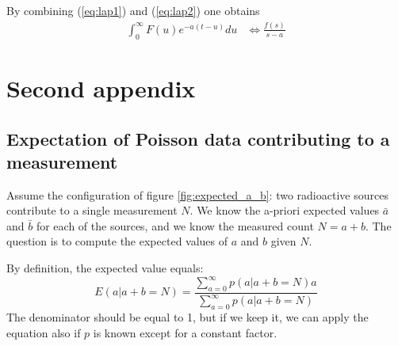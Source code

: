 \documentclass[11pt,oneside]{article}
\begin{document}
By combining (\ref{eq:lap1}) and (\ref{eq:lap2}) one obtains
\begin{align}
\int_0^\infty F(u) e^{-a(t - u)} du & \Longleftrightarrow \frac{f(s)}{s-a}
\end{align}

\section{Second appendix}

\subsection{Expectation of Poisson data contributing to a measurement} \label{app:expected_a_b}
Assume the configuration of figure \ref{fig:expected_a_b}: two radioactive
sources contribute to a single measurement $N$. We know the a-priori expected
values $\bar{a}$ and $\bar{b}$ for each of the sources, and we know the
measured count $N = a + b$. The question is to compute the expected values of
$a$ and $b$ given $N$.

 By definition, the expected value equals:
\begin{equation}
  E(a | a + b = N) = \frac{\sum_{a=0}^\infty p(a | a + b = N) a}
                          {\sum_{a=0}^\infty p(a | a + b = N)}
  \label{eq:appab1}
\end{equation}
The denominator should be equal to 1, but if we keep it, we can apply the
equation also if $p$ is known except for a constant factor.
\end{document}
